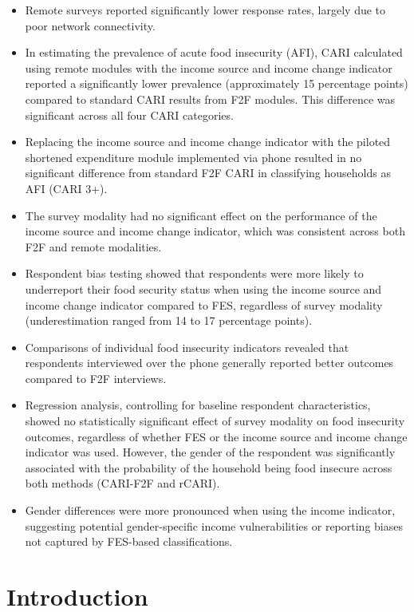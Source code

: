 \documentclass[11pt,harvard]{article}
\begin{document}
	\begin{itemize}
		\item Remote surveys reported significantly lower response rates, largely due to poor network connectivity.
		\item In estimating the prevalence of acute food insecurity (AFI), CARI calculated using remote modules with the income source and income change indicator reported a significantly lower prevalence (approximately 15 percentage points) compared to standard CARI results from F2F modules. This difference was significant across all four CARI categories.
		\item Replacing the income source and income change indicator with the piloted shortened expenditure module implemented via phone resulted in no significant difference from standard F2F CARI in classifying households as AFI (CARI 3+).
		\item The survey modality had no significant effect on the performance of the income source and income change indicator, which was consistent across both F2F and remote modalities.
		\item Respondent bias testing showed that respondents were more likely to underreport their food security status when using the income source and income change indicator compared to FES, regardless of survey modality (underestimation ranged from 14 to 17 percentage points).
		\item Comparisons of individual food insecurity indicators revealed that respondents interviewed over the phone generally reported better outcomes compared to F2F interviews.
		\item Regression analysis, controlling for baseline respondent characteristics, showed no statistically significant effect of survey modality on food insecurity outcomes, regardless of whether FES or the income source and income change indicator was used. However, the gender of the respondent was significantly associated with the probability of the household being food insecure across both methods (CARI-F2F and rCARI).
		\item Gender differences were more pronounced when using the income indicator, suggesting potential gender-specific income vulnerabilities or reporting biases not captured by FES-based classifications.
	\end{itemize}
	
	
	\pagebreak
	
	\section{Introduction}
	
\end{document}

